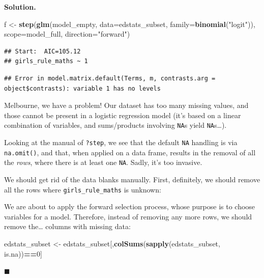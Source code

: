 \documentclass[10pt,b5paper,krantz1]{krantz}
\newenvironment{Shaded}{\begin{snugshade}}{\end{snugshade}}
\newcommand{\DataTypeTok}[1]{\textcolor[rgb]{0.27,0.27,0.27}{#1}}
\newcommand{\DecValTok}[1]{\textcolor[rgb]{0.06,0.06,0.06}{#1}}
\newcommand{\KeywordTok}[1]{\textcolor[rgb]{0.27,0.27,0.27}{\textbf{#1}}}
\newcommand{\NormalTok}[1]{#1}
\newcommand{\OperatorTok}[1]{\textcolor[rgb]{0.43,0.43,0.43}{\textbf{#1}}}
\newcommand{\StringTok}[1]{\textcolor[rgb]{0.5,0.5,0.5}{#1}}
\newenvironment{solution}{%
\bigskip\noindent\textbf{Solution. }%
\it\ignorespaces%
\ignorespaces%
}{\ignorespaces%
\hfill$\blacksquare$%
}
\begin{document}
\begin{solution}
\begin{Shaded}
\begin{Highlighting}[]
\NormalTok{f <-}\StringTok{ }\KeywordTok{step}\NormalTok{(}\KeywordTok{glm}\NormalTok{(model_empty, }\DataTypeTok{data=}\NormalTok{edstats_subset, }\DataTypeTok{family=}\KeywordTok{binomial}\NormalTok{(}\StringTok{"logit"}\NormalTok{)),}
    \DataTypeTok{scope=}\NormalTok{model_full, }\DataTypeTok{direction=}\StringTok{"forward"}\NormalTok{)}
\end{Highlighting}
\end{Shaded}

\begin{verbatim}
## Start:  AIC=105.12
## girls_rule_maths ~ 1
\end{verbatim}

\begin{verbatim}
## Error in model.matrix.default(Terms, m, contrasts.arg = object$contrasts): variable 1 has no levels
\end{verbatim}

Melbourne, we have a problem!
Our dataset has too many missing values, and those cannot be present
in a logistic regression model (it's based on a linear combination of variables,
and sums/products involving \texttt{NA}s yield \texttt{NA}s\ldots{}).

Looking at the manual of \texttt{?step}, we see that the default
\texttt{NA} handling is via \texttt{na.omit()}, and that, when applied on a data frame,
results in the removal of all the \emph{rows}, where there is at least one \texttt{NA}.
Sadly, it's too invasive.

We should get rid of the data blanks manually.
First, definitely, we should remove all the rows where
\texttt{girls\_rule\_maths} is unknown:

\begin{Shaded}
\end{Shaded}

We are about to apply the forward selection process, whose purpose is
to choose variables for a model. Therefore, instead of removing any more
rows, we should remove the\ldots{} columns with missing data:

\begin{Shaded}
\begin{Highlighting}[]
\NormalTok{edstats_subset <-}
\StringTok{    }\NormalTok{edstats_subset[,}\KeywordTok{colSums}\NormalTok{(}\KeywordTok{sapply}\NormalTok{(edstats_subset, is.na))}\OperatorTok{==}\DecValTok{0}\NormalTok{]}
\end{Highlighting}
\end{Shaded}


\end{solution}
\end{document}

